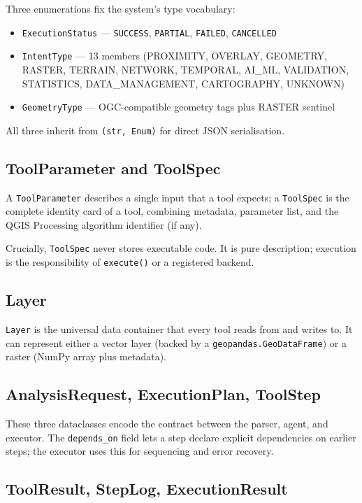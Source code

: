 \documentclass[12pt,a4paper]{report}
\begin{document}
Three enumerations fix the system's type vocabulary:

\begin{itemize}
  \item \texttt{ExecutionStatus} --- \texttt{SUCCESS}, \texttt{PARTIAL}, \texttt{FAILED}, \texttt{CANCELLED}
  \item \texttt{IntentType} --- 13 members (PROXIMITY, OVERLAY, GEOMETRY, RASTER, TERRAIN, NETWORK, TEMPORAL, AI\_ML, VALIDATION, STATISTICS, DATA\_MANAGEMENT, CARTOGRAPHY, UNKNOWN)
  \item \texttt{GeometryType} --- OGC-compatible geometry tags plus RASTER sentinel
\end{itemize}

All three inherit from \texttt{(str, Enum)} for direct JSON serialisation.

\subsection{ToolParameter and ToolSpec}

A \texttt{ToolParameter} describes a single input that a tool expects; a \texttt{ToolSpec} is the complete identity card of a tool, combining metadata, parameter list, and the QGIS Processing algorithm identifier (if any).

Crucially, \texttt{ToolSpec} never stores executable code. It is pure description; execution is the responsibility of \texttt{execute()} or a registered backend.

\subsection{Layer}

\texttt{Layer} is the universal data container that every tool reads from and writes to.  It can represent either a vector layer (backed by a \texttt{geopandas.GeoDataFrame}) or a raster (NumPy array plus metadata).

\subsection{AnalysisRequest, ExecutionPlan, ToolStep}

These three dataclasses encode the contract between the parser, agent, and executor.  The \texttt{depends\_on} field lets a step declare explicit dependencies on earlier steps; the executor uses this for sequencing and error recovery.

\subsection{ToolResult, StepLog, ExecutionResult}
\end{document}
